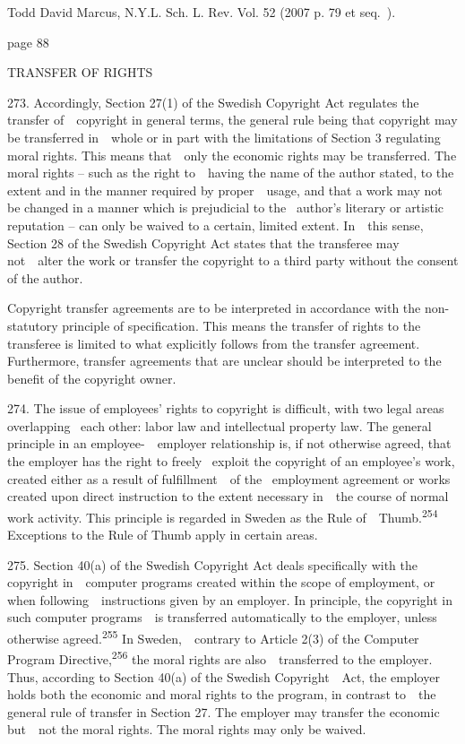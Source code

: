 \documentclass[
]{article}
\begin{document}
{Todd David Marcus, N.Y.L. Sch. L. Rev. Vol. 52 (2007 p. 79 }{et
seq.}{~).}

{page 88}

{TRANSFER OF RIGHTS}

{273. }{Accordingly, Section 27(1) of the Swedish }{Copyright Act
}{regulates the transfer of~~copyright in general terms, the general
rule being that copyright may be transferred in~~whole or in part with
the limitations of Section 3 regulating moral rights. This means
that~~only the economic rights may be transferred. The moral rights }{--
}{such as the right to~~having the name of the author stated, to the
extent and in the manner required by proper~~usage, and that a work may
not be changed in a manner which is prejudicial to the }{~author's
literary or artistic reputation -- }{can only be waived to a certain,
limited extent. In~~this sense, Section 28 of the Swedish }{Copyright
Act }{states that the transferee may not~~alter the work or transfer the
copyright to a third party without the consent of the author.}

{Copyright transfer agreements are to be interpreted in accordance with
the non-statutory }{principle of specification}{. This means the
transfer of rights to the transferee is limited to what explicitly
follows from the transfer agreement. Furthermore, transfer agreements
that are unclear should be interpreted to the benefit of the copyright
owner.}

{274. }{The i}{ssue of employees' rights to copyright is difficult, with
two legal areas overlapping }{~each other: labor law and intellectual
property law. The general principle in an employee-~~employer
relationship is, if not otherwise agreed, that the employer has the
right to freely }{~exploit the copyright of an employee's work, created
either as a result of fulfillment~~of the }{~employment agreement or
works created upon direct instruction to the extent necessary in~~the
course of normal work activity. This principle is regarded in Sweden as
the }{Rule of~~Thumb.}\textsuperscript{{254 }}{Exceptions to the Rule of
Thumb apply in certain areas.}

{275. }{Section 40(a) of the Swedish }{Copyright Act }{deals
specifically with the copyright in~~computer programs created within the
scope of employment, or when following~~instructions given by an
employer. In principle, the copyright in such computer programs~~is
transferred automatically to the employer, unless otherwise
agreed.}\textsuperscript{{255 }}{In Sweden,~~contrary to Article 2(3) of
the }{Computer Program Directive,}\textsuperscript{{256 }}{the moral
rights are also~~transferred to the employer. Thus, according to Section
40(a) of the Swedish }{Copyright~~Act}{, the employer holds both the
economic and moral rights to the program, in contrast to~~the general
rule of transfer in Section 27. The employer may transfer the economic
but~~not the moral rights. The moral rights may only be waived.}
\end{document}
